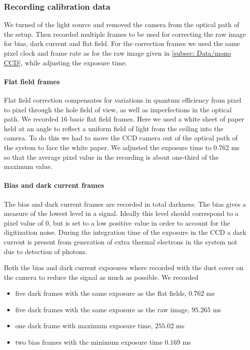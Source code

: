 \documentclass{emulateapj}
\begin{document}
\subsubsection{Recording calibration data}
\label{subsubsec: Method/Calibration data}
We turned of the light source and removed the camera from the optical path of the setup. Then recorded multiple frames to be used for correcting the raw image for bias, dark current and flat field. For the correction frames we used the same pixel clock and frame rate as for the raw image given in \cref{subsec: Data/mono CCD}, while adjusting the exposure time.

\paragraph{Flat field frames}
Flat field correction compensates for variations in quantum efficiency from pixel to pixel through the hole field of view, as well as imperfections in the optical path. We recorded $16$ basic flat field frames. Here we used a white sheet of paper held at an angle to reflect a uniform field of light from the ceiling into the camera. To do this we had to move the CCD camera out of the optical path of the system to face the white paper. We adjusted the exposure time to $0.762$ ms so that the average pixel value in the recording is about one-third of the maximum value.

\paragraph{Bias and dark current frames}
The bias and dark current frames are recorded in total darkness. The bias gives a measure of the lowest level in a signal. Ideally this level should correspond to a pixel value of $0$, but is set to a low positive value in order to account for the digitization noise. During the integration time of the exposure in the CCD a dark current is present from generation of extra thermal electrons in the system not due to detection of photons.

Both the bias and dark current exposures where recorded with the dust cover on the camera to reduce the signal as much as possible. We recorded 
\begin{itemize}
\item five dark frames with the same exposure as the flat fields, $0.762$ ms
\item five dark frames with the same exposure as the raw image, $95.265$ ms
\item one dark frame with maximum exposure time, $255.02$ ms
\item two bias frames with the minimum exposure time $0.169$ ms
\end{itemize}
 
\end{document}
